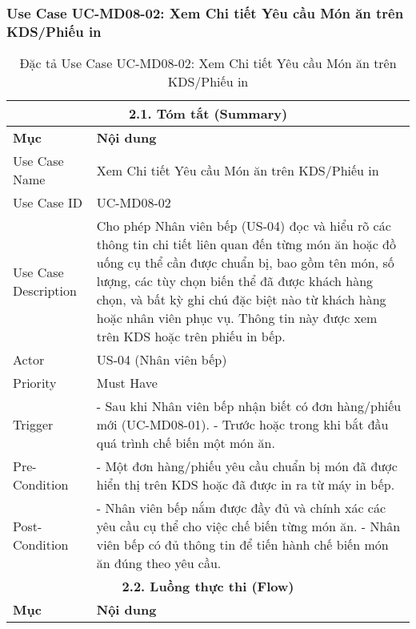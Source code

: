 \subsubsection{Use Case UC-MD08-02: Xem Chi tiết Yêu cầu Món ăn trên KDS/Phiếu in}
\begin{longtable}{|m{4cm}|p{11cm}|}
\caption{Đặc tả Use Case UC-MD08-02: Xem Chi tiết Yêu cầu Món ăn trên KDS/Phiếu in} \label{tab:uc_md08_02_final_v2} \\
\hline
\multicolumn{2}{|c|}{\textbf{2.1. Tóm tắt (Summary)}} \\
\hline
\textbf{Mục} & \textbf{Nội dung} \\
\hline
\endhead %
\hline
\endfoot %
\hline
\endlastfoot %
Use Case Name & Xem Chi tiết Yêu cầu Món ăn trên KDS/Phiếu in \\
\hline
Use Case ID & UC-MD08-02 \\
\hline
Use Case Description & Cho phép Nhân viên bếp (US-04) đọc và hiểu rõ các thông tin chi tiết liên quan đến từng món ăn hoặc đồ uống cụ thể cần được chuẩn bị, bao gồm tên món, số lượng, các tùy chọn biến thể đã được khách hàng chọn, và bất kỳ ghi chú đặc biệt nào từ khách hàng hoặc nhân viên phục vụ. Thông tin này được xem trên KDS hoặc trên phiếu in bếp. \\
\hline
Actor & US-04 (Nhân viên bếp) \\
\hline
Priority & Must Have \\
\hline
Trigger & - Sau khi Nhân viên bếp nhận biết có đơn hàng/phiếu mới (UC-MD08-01). \newline - Trước hoặc trong khi bắt đầu quá trình chế biến một món ăn. \\
\hline
Pre-Condition & - Một đơn hàng/phiếu yêu cầu chuẩn bị món đã được hiển thị trên KDS hoặc đã được in ra từ máy in bếp. \\
\hline
Post-Condition & - Nhân viên bếp nắm được đầy đủ và chính xác các yêu cầu cụ thể cho việc chế biến từng món ăn. \newline - Nhân viên bếp có đủ thông tin để tiến hành chế biến món ăn đúng theo yêu cầu. \\
\hline
\multicolumn{2}{|c|}{\textbf{2.2. Luồng thực thi (Flow)}} \\
\hline
\textbf{Mục} & \textbf{Nội dung} \\
\hline

\end{longtable}
